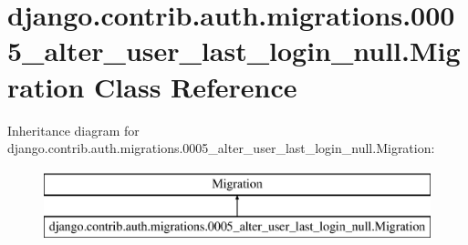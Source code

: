 \hypertarget{classdjango_1_1contrib_1_1auth_1_1migrations_1_10005__alter__user__last__login__null_1_1_migration}{}\section{django.\+contrib.\+auth.\+migrations.0005\+\_\+alter\+\_\+user\+\_\+last\+\_\+login\+\_\+null.Migration Class Reference}
\label{classdjango_1_1contrib_1_1auth_1_1migrations_1_10005__alter__user__last__login__null_1_1_migration}
Inheritance diagram for django.\+contrib.\+auth.\+migrations.0005\+\_\+alter\+\_\+user\+\_\+last\+\_\+login\+\_\+null.Migration\+:\begin{figure}[H]
\begin{center}
\leavevmode
\includegraphics[height=2.000000cm]{classdjango_1_1contrib_1_1auth_1_1migrations_1_10005__alter__user__last__login__null_1_1_migration}
\end{center}
\end{figure}
